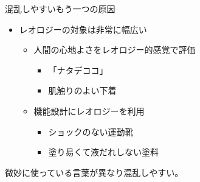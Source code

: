 \begin{frame}

\begin{block}{混乱しやすいもう一つの原因}

\begin{itemize}

\item
  レオロジーの対象は非常に幅広い

  \begin{itemize}
  
  \item
    人間の心地よさをレオロジー的感覚で評価

    \begin{itemize}
    
    \item
      「ナタデココ」
    \item
      肌触りのよい下着
    \end{itemize}
  \item
    機能設計にレオロジーを利用

    \begin{itemize}
    
    \item
      ショックのない運動靴
    \item
      塗り易くて液だれしない塗料
    \end{itemize}
  \end{itemize}
\end{itemize}

{微妙に使っている言葉が異なり混乱しやすい。}

\end{block}

\end{frame}

